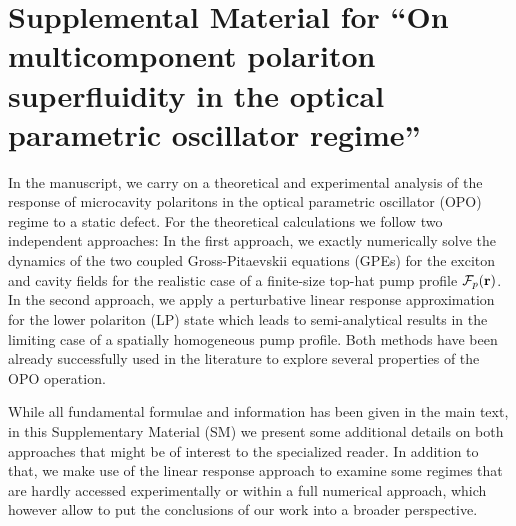 \newpage


\setcounter{secnumdepth}{2}

\renewcommand{\figurename}{\textsc{S.~Fig.}}

\setcounter{equation}{0}
\setcounter{figure}{0}

\section{Supplemental Material for ``On multicomponent polariton
  superfluidity in the optical parametric oscillator regime''}


In the manuscript, we carry on a theoretical and experimental analysis
of the response of microcavity polaritons in the optical parametric
oscillator (OPO) regime to a static defect.
%
For the theoretical calculations we follow two independent approaches:
In the first approach, we exactly numerically solve the dynamics of
the two coupled Gross-Pitaevskii equations (GPEs) for the exciton and
cavity fields for the realistic case of a finite-size top-hat pump
profile $\mathcal{F}_p({\mathbf r})$. In the second approach, we apply a
perturbative linear response approximation for the lower polariton
(LP) state which leads to semi-analytical results in the limiting case
of a spatially homogeneous pump profile. Both methods have been
already successfully used in the literature to explore several
properties of the OPO operation.

While all fundamental formulae and information has been given in the
main text, in this Supplementary Material (SM) we present some
additional details on both approaches that might be of interest to the
specialized reader.  In addition to that, we make use of the linear
response approach to examine some regimes that are hardly accessed
experimentally or within a full numerical approach, which however
allow to put the conclusions of our work into a broader perspective.


